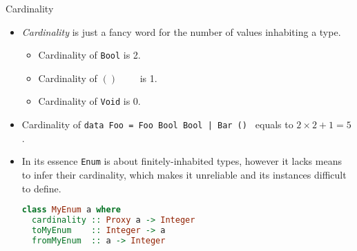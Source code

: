 \documentclass[handout]{beamer}
\begin{document}
\begin{frame}[fragile]{Cardinality}

\begin{itemize}[<+->]

\item
{\em Cardinality} is just a fancy word for the number of values
inhabiting a type.

\begin{itemize}[<+->]
  \item Cardinality of {\tt Bool} is 2.
  \item Cardinality of $()$~~~~ is 1.
  \item Cardinality of {\tt Void} is 0.
\end{itemize}

\item Cardinality of
{\tt data Foo = Foo Bool Bool | Bar () }
equals to $2\times2 + 1 = 5$.

\item
In its essence {\tt Enum} is about finitely-inhabited types,
however it lacks means to infer their cardinality,
which makes it unreliable and its instances difficult to define.

\pause

\begin{lstlisting}[language=Haskell]
class MyEnum a where
  cardinality :: Proxy a -> Integer
  toMyEnum    :: Integer -> a
  fromMyEnum  :: a -> Integer
\end{lstlisting}

\end{itemize}

\end{frame}
\end{document}
